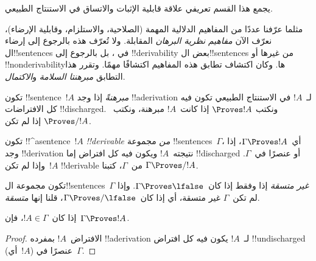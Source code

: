 \documentclass[../../../include/open-logic-section]{subfiles}
\begin{document}
      {}
      {}


\begin{editorial}
يجمع هذا القسم تعريفي علاقة قابلية الإثبات والاتساق في الاستنتاج
الطبيعي.
\end{editorial}

\begin{explain}
مثلما عرّفنا عددًا من المفاهيم الدلالية المهمة (الصلاحية، والاستلزام،
وقابلية الإرضاء)، نعرّف الآن \emph{مفاهيم نظرية البرهان} المقابلة. ولا
تُعرّف هذه بالرجوع إلى إرضاء ال!!{sentence}s في
، بل بالرجوع إلى
!!{derivability} بعض ال!!{sentence}s من غيرها أو !!{nonderivability}ها.
وكان اكتشاف تطابق هذه المفاهيم اكتشافًا مهمًا. وتقرر هذا التطابق
\emph{مبرهنتا السلامة} و\emph{الاكتمال}.
\end{explain}


\begin{defn}[المبرهنات]
تكون !!{sentence}~$!A$ \emph{مبرهنةً} إذا وجد !!a{derivation} لـ~$!A$
في الاستنتاج الطبيعي تكون فيه كل الافتراضات !!{discharged}. ونكتب
$\Proves !A$ إذا كانت~$!A$ مبرهنة، ونكتب~$\Proves/ !A$ إذا لم تكن.
\end{defn}

\begin{defn}[!!^{derivability}]
تكون !!^a{sentence}~$!A$ \emph{!!{derivable} من} مجموعة
!!{sentence}s~$\Gamma$، أي~$\Gamma \Proves !A$، إذا وجد
!!{derivation} نتيجته~$!A$ ويكون فيه كل افتراض إما !!{discharged} أو
عنصرًا في~$\Gamma$. وإذا لم تكن~$!A$ !!{derivable} من~$\Gamma$، كتبنا
$\Gamma \Proves/ !A$.
\end{defn}

\begin{defn}[الاتساق]
تكون مجموعة ال!!{sentence}s~$\Gamma$ \emph{غير متسقة} إذا وفقط إذا
كان~$\Gamma \Proves \lfalse$. وإذا لم تكن~$\Gamma$ غير متسقة، أي إذا
كان~$\Gamma \Proves/ \lfalse$، قلنا إنها \emph{متسقة}.
\end{defn}

\begin{prop}[الانعكاسية]
إذا كان~$!A \in \Gamma$، فإن~$\Gamma \Proves !A$.
\end{prop}

\begin{proof}
الافتراض~$!A$ بمفرده !!a{derivation} لـ~$!A$ يكون فيه كل افتراض
!!{undischarged} (أي~$!A$) عنصرًا في~$\Gamma$.
\end{proof}
  
\end{document}
